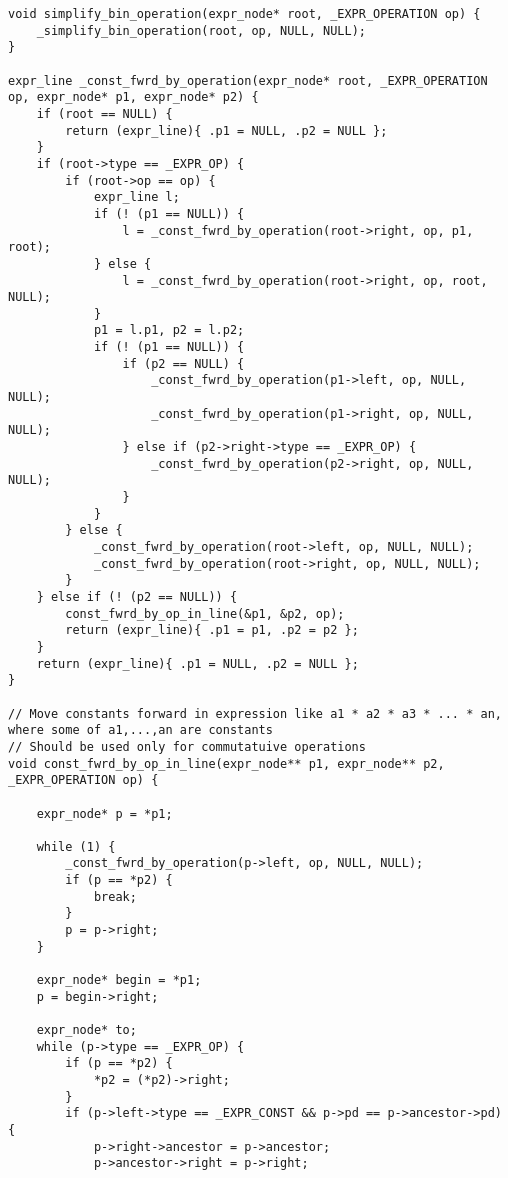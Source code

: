 \documentclass[a4paper]{article}
\newcounter{i}
\begin{document}
\begin{enumerate}[label=\textbf{\arabic*}.]
\begin{verbatim}
void simplify_bin_operation(expr_node* root, _EXPR_OPERATION op) {
    _simplify_bin_operation(root, op, NULL, NULL);
}

expr_line _const_fwrd_by_operation(expr_node* root, _EXPR_OPERATION op, expr_node* p1, expr_node* p2) {
    if (root == NULL) {
        return (expr_line){ .p1 = NULL, .p2 = NULL };
    }
    if (root->type == _EXPR_OP) {
        if (root->op == op) {
            expr_line l;
            if (! (p1 == NULL)) {
                l = _const_fwrd_by_operation(root->right, op, p1, root);
            } else {
                l = _const_fwrd_by_operation(root->right, op, root, NULL);            
            }
            p1 = l.p1, p2 = l.p2;
            if (! (p1 == NULL)) {
                if (p2 == NULL) {
                    _const_fwrd_by_operation(p1->left, op, NULL, NULL);
                    _const_fwrd_by_operation(p1->right, op, NULL, NULL);
                } else if (p2->right->type == _EXPR_OP) {
                    _const_fwrd_by_operation(p2->right, op, NULL, NULL);
                }
            }        
        } else {
            _const_fwrd_by_operation(root->left, op, NULL, NULL);
            _const_fwrd_by_operation(root->right, op, NULL, NULL);
        }
    } else if (! (p2 == NULL)) {
        const_fwrd_by_op_in_line(&p1, &p2, op);
        return (expr_line){ .p1 = p1, .p2 = p2 };
    }
    return (expr_line){ .p1 = NULL, .p2 = NULL };
}

// Move constants forward in expression like a1 * a2 * a3 * ... * an, where some of a1,...,an are constants
// Should be used only for commutatuive operations
void const_fwrd_by_op_in_line(expr_node** p1, expr_node** p2, _EXPR_OPERATION op) {

    expr_node* p = *p1;

    while (1) {
        _const_fwrd_by_operation(p->left, op, NULL, NULL);
        if (p == *p2) {
            break;
        }
        p = p->right;
    }

    expr_node* begin = *p1;
    p = begin->right;
    
    expr_node* to;
    while (p->type == _EXPR_OP) {
        if (p == *p2) {
            *p2 = (*p2)->right;
        }
        if (p->left->type == _EXPR_CONST && p->pd == p->ancestor->pd) {
            p->right->ancestor = p->ancestor;
            p->ancestor->right = p->right;


\end{verbatim}
\end{enumerate}
\end{document}
